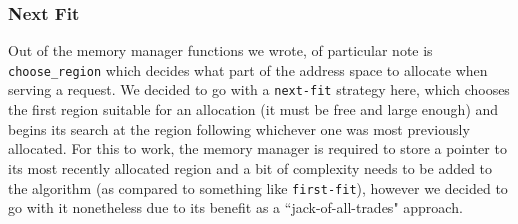 \subsubsection{Next Fit}
Out of the memory manager functions we wrote, of particular note is \texttt{choose\_region} which decides what part of the address space to allocate when serving a request. We decided to go with a \texttt{next-fit} strategy here, which chooses the first region suitable for an allocation (it must be free and large enough) and begins its search at the region following whichever one was most previously allocated. For this to work, the memory manager is required to store a pointer to its most recently allocated region and a bit of complexity needs to be added to the algorithm (as compared to something like \texttt{first-fit}), however we decided to go with it nonetheless due to its benefit as a ``jack-of-all-trades" approach.


